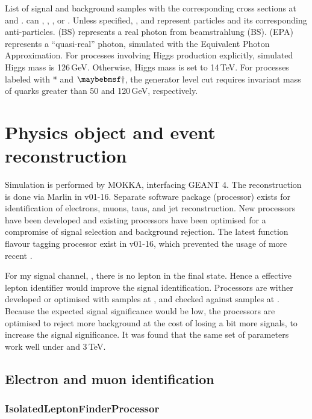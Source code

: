 \begin{table}[!tbp]
\caption[]{List of signal and background samples with the corresponding cross sections at  and . \Pquark can \Pup, \Pdown, \Pstrange, \Pbottom or \Ptop. Unless specified, \Pquark, \Plepton and \Pnu represent particles and its corresponding anti-particles. \Pphoton(BS) represents a real photon from beamstrahlung (BS). \Pphoton(EPA) represents a ``quasi-real'' photon, simulated with the Equivalent Photon Approximation. For processes involving Higgs production explicitly, simulated Higgs mass is 126\,GeV. Otherwise, Higgs mass is set to 14\,TeV. For processes labeled with * and $\myDagger$, the generator level cut requires invariant mass of quarks greater than 50 and 120\,GeV, respectively.}
\label{tab:samples_xsec}
\end{table}
\section{Physics object and event reconstruction}

Simulation is performed by MOKKA, interfacing GEANT 4.
The reconstruction is done via Marlin in \ilcsoft v01-16. Separate software package (processor) exists for identification of electrons, muons, taus, and jet reconstruction. New processors have been developed and existing processors have been optimised for a compromise of signal selection and background rejection. The latest function flavour tagging processor exist in \ilcsoft v01-16, which prevented the usage of more recent \ilcsoft.


For my signal channel, \eeToHHbbWW, there is no lepton in the final state. Hence a effective lepton identifier would improve the signal identification. Processors are wither developed or optimised with samples at , and checked against samples at . Because the expected signal significance would be low, the processors are optimised to reject more background at the cost of losing a bit more signals, to increase the signal significance. It was found that the same set of parameters work well under  and 3\,TeV.



\subsection{Electron and muon identification}
\label{sec:doubleHiggsLeptonID}


\subsubsection{IsolatedLeptonFinderProcessor}

